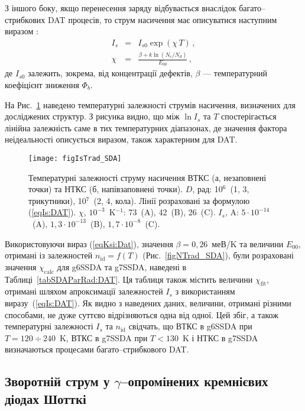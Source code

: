 З іншого боку,  якщо перенесення заряду відбувається внаслідок багато--стрибкових DAT процесів, то струм насичення має описуватися наступним виразом \cite{Evstropov}:
\begin{eqnarray}
  I_s&=&I_{s0}\exp(\chi\,T) \label{eqIs:DAT}\,,\\
   \chi&=&\frac{\beta+k\ln(N_c/N_d)}{E_{00}}\,, \label{eqKsi:Dat}
\end{eqnarray}
де
$I_{s0}$ залежить, зокрема, від концентрації дефектів,
$\beta$ --- температурний коефіцієнт зниження $\Phi_b$.

На Рис.~\ref{figIsTrad_SDA} наведено температурні залежності струмів насичення, визначених для досліджених структур.
З рисунка видно, що між $\ln I_s$ та $T$ спостерігається лінійна залежність саме в тих температурних діапазонах,
де значення фактора неідеальності описується виразом, також характерним для DAT.


\begin{figure}
\center
\texttt{[image: figIsTrad\_SDA]}
\caption{\label{figIsTrad_SDA}
Температурні залежності струму насичення ВТКС (а, незаповнені точки)
та НТКС (б, напівзаповнені точки).
$D$, рад: 10$^6$~(1, 3, трикутники), 10$^7$~(2, 4, кола).
Лінії розраховані за формулою (\ref{eqIs:DAT}).
$\chi$, $10^{-3}$~K$^{-1}$: 73~(A), 42~(B), 26~(C).
$I_s$, A: $5\cdot10^{-14}$~(A),
$1,3\cdot10^{-13}$~(B),
$1,7\cdot10^{-8}$~(C).
}%
\end{figure}

Використовуючи вираз (\ref{eqKsi:Dat}), значення $\beta=0,26$~меВ/K \cite{Aboelfotoh, Evstropov} та величини $E_{00}$,
отримані із залежностей $n_\mathrm{id}=f(T)$ (Рис.~\ref{figNTrad_SDA}),
були розраховані значення $\chi_\mathrm{calc}$ для g6SSDA та g7SSDA, наведені в Таблиці~\ref{tabSDAParRad:DAT}.
Ця таблиця також містить величини $\chi_\mathrm{fit}$, отримані шляхом апроксимації залежностей $I_s$ з використанням виразу~(\ref{eqIs:DAT}).
Як видно з наведених даних, величини, отримані різними способами, не дуже суттєво відрізняються одна від одної.
Цей збіг, а також температурні залежності $I_s$ та $n_\mathrm{id}$ свідчать,
що ВТКС в g6SSDA при $T=120\div240$~K, ВТКС в g7SSDA при $T<130$~K і НТКС в g7SSDA визначаються процесами багато--стрибкового DAT.






\subsection{Зворотній струм у $\gamma$--опромінених кремнієвих діодах Шотткі}

